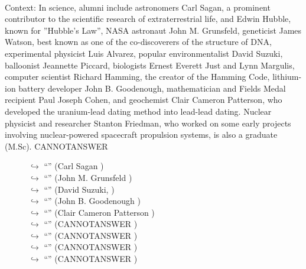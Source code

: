 \documentclass[11pt,a4paper, onecolumn]{article}
\begin{document}
\\ Context: In science, alumni include astronomers Carl Sagan, a prominent contributor to the scientific research of extraterrestrial life, and Edwin Hubble, known for ''Hubble's Law'', NASA astronaut John M. Grunsfeld, geneticist James Watson, best known as one of the co-discoverers of the structure of DNA, experimental physicist Luis Alvarez, popular environmentalist David Suzuki, balloonist Jeannette Piccard, biologists Ernest Everett Just and Lynn Margulis, computer scientist Richard Hamming, the creator of the Hamming Code, lithium-ion battery developer John B. Goodenough, mathematician and Fields Medal recipient Paul Joseph Cohen, and geochemist Clair Cameron Patterson, who developed the uranium-lead dating method into lead-lead dating. Nuclear physicist and researcher Stanton Friedman, who worked on some early projects involving nuclear-powered spacecraft propulsion systems, is also a graduate (M.Sc). CANNOTANSWER

\begin{figure}[t] \small \begin{tcolorbox}[boxsep=0pt,left=5pt,right=0pt,top=2pt,colback = yellow!5] \begin{dialogue}
 \small 
\colorbox{pink!25}{$\hookrightarrow$}
{ ``'' (Carl Sagan ) }
\\
\colorbox{pink!25}{$\hookrightarrow$}
{ ``'' (John M. Grunsfeld ) }
\\
\colorbox{pink!25}{$\hookrightarrow$}
{ ``'' (David Suzuki, ) }
\\
\colorbox{pink!25}{$\hookrightarrow$}
{ ``'' (John B. Goodenough ) }
\\
\colorbox{pink!25}{$\hookrightarrow$}
{ ``'' (Clair Cameron Patterson ) }
\\
\colorbox{pink!25}{$\hookrightarrow$}
{ ``'' (CANNOTANSWER ) }
\\
\colorbox{pink!25}{$\hookrightarrow$}
{ ``'' (CANNOTANSWER ) }
\\
\colorbox{pink!25}{$\hookrightarrow$}
{ ``'' (CANNOTANSWER ) }
\\
\colorbox{pink!25}{$\hookrightarrow$}
{ ``'' (CANNOTANSWER ) }
\\
 \end{dialogue}\end{tcolorbox}\end{figure}
\end{document}
